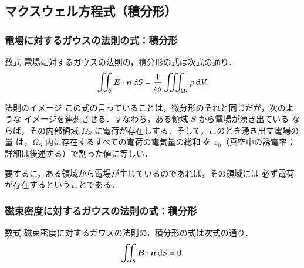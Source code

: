         \subsection{マクスウェル方程式（積分形）}
            \subsubsection{電場に対するガウスの法則の式：積分形}
            \begin{mysmallsec}{数式}
                電場に対するガウスの法則の，積分形の式は次式の通り．
                \begin{align}
                    \int\mspace{-11mu}\int_{S} \boldsymbol{E} \cdot \boldsymbol{n} \,\mathrm{d} S = \frac{1}{\varepsilon_{0}} \int\mspace{-11mu}\int\mspace{-11mu}\int_{\Omega_{S}} \rho \,\mathrm{d} V.
                \end{align}
            \end{mysmallsec}

            \begin{mysmallsec}{法則のイメージ}
                この式の言っていることは，微分形のそれと同じだが，次のような
                イメージを連想させる．すなわち，ある領域 $S$ から電場が湧き出ている
                ならば，その内部領域 $\Omega_{S}$ に電荷が存在しする．そして，このとき湧き出す電場の量
                は，$\Omega_{S}$ 内に存在するすべての電荷の電気量の総和
                を $\varepsilon_{0}$（真空中の誘電率；詳細は後述する）で割った値に等しい．

                要するに，ある領域から電場が生じているのであれば，その領域には
                必ず電荷が存在するということである．
            \end{mysmallsec}

            \subsubsection{磁束密度に対するガウスの法則の式：積分形}
            \begin{mysmallsec}{数式}
                磁束密度に対するガウスの法則の，積分形の式は次式の通り．
                \begin{align}
                    \int\mspace{-11mu}\int_{S} \boldsymbol{B} \cdot \boldsymbol{n} \,\mathrm{d} S = 0.
                \end{align}
            \end{mysmallsec}

